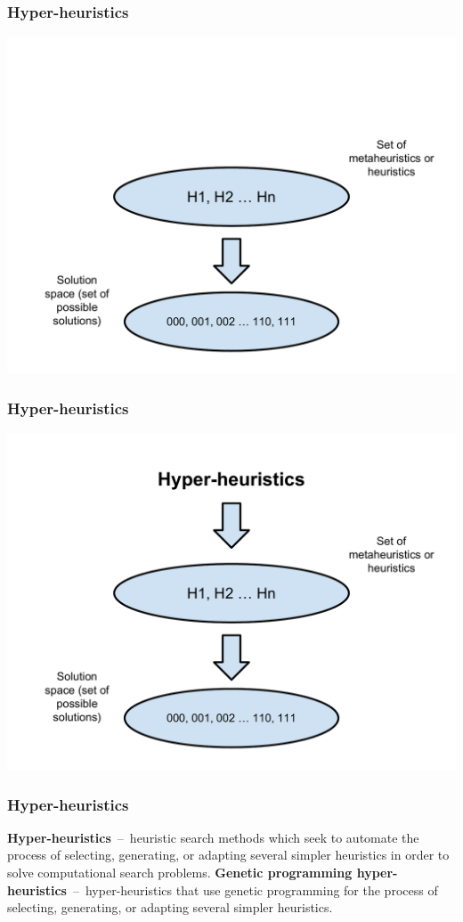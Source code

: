 \documentclass{beamer}
\newcommand{\linespace}{\vskip 0.25cm}
\begin{document}
\begin{frame}
	\frametitle{Hyper-heuristics}
	\includegraphics[height=.9\textheight]{Illustrations/heuristic_1.PDF}
\end{frame}

\begin{frame}
	\frametitle{Hyper-heuristics}
	\includegraphics[height=.9\textheight]{Illustrations/heuristic_2.PDF}
\end{frame}

\begin{frame}
	\frametitle{Hyper-heuristics}
	\textbf{Hyper-heuristics}~--~heuristic search methods which seek to automate the process of selecting, generating, or adapting several simpler heuristics in order to solve computational search problems.
	\linespace
	\pause
	\textbf{Genetic programming hyper-heuristics}~--~hyper-heuristics that use genetic programming for the process of selecting, generating, or adapting several simpler heuristics.
\end{frame}
\end{document}
